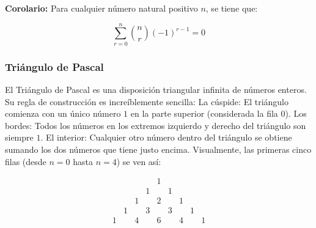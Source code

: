 \documentclass[12pt]{article}
\theoremstyle{definition}
\theoremstyle{plain}
\theoremstyle{plain}
\theoremstyle{definition}
\begin{document}
            \textbf{Corolario:}
            Para cualquier número natural positivo \(n\), se tiene que:

            \begin{equation*}
                \sum_{r=0}^{n} \binom{n}{r} (-1)^{r-1}= 0
            \end{equation*}







        \subsubsection{Triángulo de Pascal}

            El Triángulo de Pascal es una disposición triangular infinita de números enteros. Su regla de construcción es increíblemente sencilla: La cúspide: El triángulo comienza con un único número $1$ en la parte superior (considerada la fila $0$). Los bordes: Todos los números en los extremos izquierdo y derecho del triángulo son siempre $1$. El interior: Cualquier otro número dentro del triángulo se obtiene sumando los dos números que tiene justo encima. Visualmente, las primeras cinco filas (desde $n=0$ hasta $n=4$) se ven así:

            $$\begin{matrix}
                & & & & 1 & & & & \\
                & & & 1 & & 1 & & & \\
                & & 1 & & 2 & & 1 & & \\
                & 1 & & 3 & & 3 & & 1 & \\
                1 & & 4 & & 6 & & 4 & & 1
            \end{matrix}$$
\end{document}
